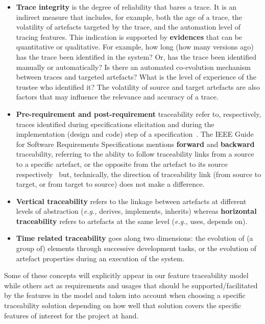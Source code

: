 \begin{itemize}
	\item \textbf{Trace integrity} is the degree of reliability that bares a trace. It is an indirect measure that includes, for example, both the age of a trace, the volatility of artefacts targeted by the trace, and the automation level of tracing features. This indication is supported by \textbf{evidences} that can be quantitative or qualitative. For example, how long (how many versions ago) has the trace been identified in the system? Or, has the trace been identified manually or automatically? Is there an automated co-evolution mechanism between traces and targeted artefacts? What is the level of experience of the trustee who identified it? 
	The volatility of source and target artefacts are also factors that may influence the relevance and accuracy of a trace.
	
	\item \textbf{Pre-requirement and post-requirement} traceability refer to, respectively, traces identified during specifications elicitation and during the implementation (design and code) step of a specification~\cite{gotel1994}.
	The IEEE Guide for Software Requirements Specifications mentions \textbf{forward} and \textbf{backward} traceability, referring to the ability to follow traceability links from a source to a specific artefact, or the opposite from the artefact to its source respectively~\cite{ieeeglossary-req} but, technically, the direction of traceability link (from source to target, or from target to source) does not make a difference.
	
	\item \textbf{Vertical traceability} refers to the linkage between artefacts at different levels of abstraction (\textit{e.g.,} derives, implements, inherits) whereas \textbf{horizontal traceability} refers to artefacts at the same level (\textit{e.g.,} uses, depends on). 
	
	\item \textbf{Time related traceability} goes along two dimensions: the evolution of (a group of) elements through successive development tasks, or the evolution of artefact properties during an execution of the system. %
\end{itemize}

Some of these concepts will explicitly appear in our feature traceability model while others act as requirements and usages that should be supported/facilitated by the features in the model and taken into account when choosing a specific traceability solution depending on how well that solution covers the specific features of interest for the project at hand.

